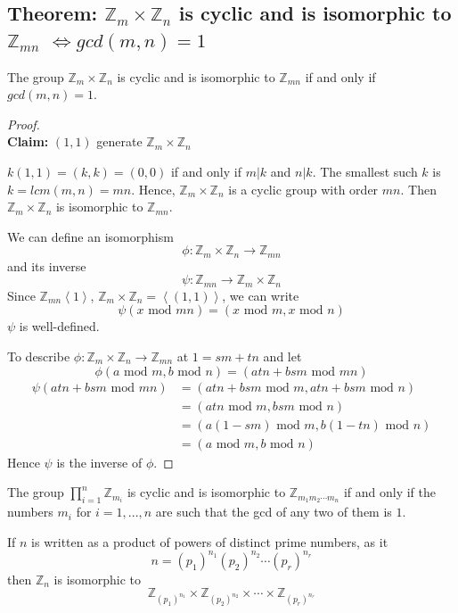 \documentclass[11pt]{elegantbook}
\begin{document}
\subsection{Theorem: $\mathbb{Z}_m\times \mathbb{Z}_n$ is cyclic and is isomorphic to $\mathbb{Z}_{mn}$ $\Leftrightarrow gcd(m,n)=1$}
\begin{theorem}
The group $\mathbb{Z}_m\times \mathbb{Z}_n$ is cyclic and is isomorphic to $\mathbb{Z}_{mn}$ if and only if $gcd(m,n)=1$.
\end{theorem}
\begin{proof}
\quad\\
\textbf{Claim:} $(1,1)$ generate $\mathbb{Z}_m\times \mathbb{Z}_n$

$k(1,1)=(k,k)=(0,0)$ if and only if $m|k$ and $n|k$. The smallest such $k$ is $k=lcm(m,n)=mn$. Hence, $\mathbb{Z}_m\times \mathbb{Z}_n$ is a cyclic group with order $mn$. Then $\mathbb{Z}_m\times \mathbb{Z}_n$ is isomorphic to $\mathbb{Z}_{mn}$.

We can define an isomorphism $$\phi:\mathbb{Z}_m\times \mathbb{Z}_n \rightarrow \mathbb{Z}_{mn}$$ and its inverse $$\psi: \mathbb{Z}_{mn} \rightarrow \mathbb{Z}_m\times \mathbb{Z}_n$$
Since $\mathbb{Z}_{mn}\left\langle 1\right\rangle$, $\mathbb{Z}_m\times \mathbb{Z}_n=\left\langle (1,1)\right\rangle$, we can write $$\psi(x\text{ mod }mn)=(x\text{ mod }m,x\text{ mod }n)$$
$\psi$ is well-defined.

To describe $\phi:\mathbb{Z}_m\times \mathbb{Z}_n \rightarrow \mathbb{Z}_{mn}$ at $1=sm+tn$ and let $$\phi(a\text{ mod }m,b\text{ mod }n)=(atn+bsm\text{ mod }mn)$$
\begin{equation}
    \begin{aligned}
        \psi(atn+bsm\text{ mod }mn)&=(atn+bsm\text{ mod }m,atn+bsm\text{ mod }n)\\
        &=(atn\text{ mod }m,bsm\text{ mod }n)\\
        &=(a(1-sm)\text{ mod }m,b(1-tn)\text{ mod }n)\\
        &=(a\text{ mod }m,b\text{ mod }n)
    \end{aligned}
    \nonumber
\end{equation}
Hence $\psi$ is the inverse of $\phi$.
\end{proof}



\begin{corollary}
    The group $\prod_{i=1}^n \mathbb{Z}_{m_i}$ is cyclic and is isomorphic to $\mathbb{Z}_{m_1m_2\cdots m_n}$ if and only if the numbers $m_i$ for $i=1,...,n$ are such that the gcd of any two of them is $1$.
\end{corollary}
\begin{example}
If $n$ is written as a product of powers of distinct prime numbers, as it $$n=(p_1)^{n_1}(p_2)^{n_2}\cdots(p_r)^{n_r}$$
then $\mathbb{Z}_n$ is isomorphic to $$\mathbb{Z}_{(p_1)^{n_1}}\times \mathbb{Z}_{(p_2)^{n_2}}\times \cdots\times \mathbb{Z}_{(p_r)^{n_r}}$$
\end{example}
\end{document}
